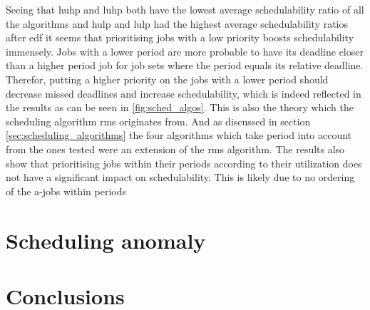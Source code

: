 \documentclass{kththesis}
\begin{document}
Seeing that \acrshort{huhp} and \acrshort{luhp} both have the lowest average schedulability ratio of
all the algorithms and \acrshort{hulp} and \acrshort{lulp} had the highest average schedulability
ratios after \acrshort{edf} it seems that prioritising jobs with a low priority boosts
schedulability immensely. Jobs with a lower period are more probable to have its deadline closer
than a higher period job for job sets where the period equals its relative deadline. Therefor,
putting a higher priority on the jobs with a lower period should decrease missed deadlines and
increase schedulability, which is indeed reflected in the results as can be seen in
\ref{fig:sched_algos}. This is also the theory which the scheduling algorithm \acrshort{rms}
originates from. And as discussed in section \ref{sec:scheduling_algorithms} the four algorithms
which take period into account from the ones tested were an extension of the \acrshort{rms}
algorithm. 
The results also show that prioritising jobs within their periods according to their utilization
does not have a significant impact on schedulability. This is likely due to no ordering of the
\acrshort{a}-jobs within periods 






\section{Scheduling anomaly}

\section{Conclusions}

\end{document}
